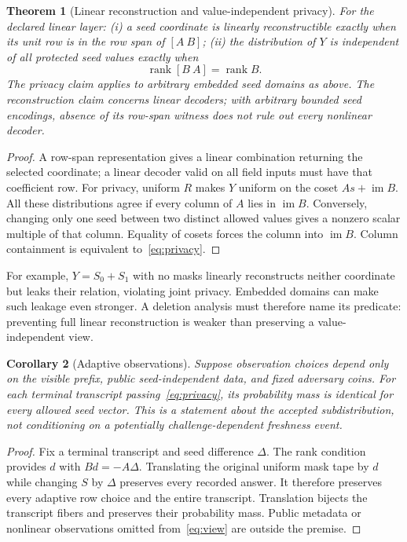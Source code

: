 \documentclass[pdflatex,sn-mathphys-num]{sn-jnl}
\theoremstyle{plain}
\newtheorem{theorem}{Theorem}
\newtheorem{corollary}[theorem]{Corollary}
\theoremstyle{definition}
\begin{document}
\begin{theorem}[Linear reconstruction and value-independent privacy]\label{thm:rank}
For the declared linear layer: (i) a seed coordinate is linearly reconstructible exactly when its unit row is in the row span of $[A\ B]$; (ii) the distribution of $Y$ is independent of all protected seed values exactly when
\begin{equation}\label{eq:privacy}
 \operatorname{rank}[B\ A]=\operatorname{rank}B.
\end{equation}
The privacy claim applies to arbitrary embedded seed domains as above. The reconstruction claim concerns linear decoders; with arbitrary bounded seed encodings, absence of its row-span witness does not rule out every nonlinear decoder.
\end{theorem}
\begin{proof}
A row-span representation gives a linear combination returning the selected coordinate; a linear decoder valid on all field inputs must have that coefficient row. For privacy, uniform $R$ makes $Y$ uniform on the coset $A s+\operatorname{im}B$. All these distributions agree if every column of $A$ lies in $\operatorname{im}B$. Conversely, changing only one seed between two distinct allowed values gives a nonzero scalar multiple of that column. Equality of cosets forces the column into $\operatorname{im}B$. Column containment is equivalent to~\eqref{eq:privacy}.
\end{proof}

For example, $Y=S_0+S_1$ with no masks linearly reconstructs neither coordinate but leaks their relation, violating joint privacy. Embedded domains can make such leakage even stronger. A deletion analysis must therefore name its predicate: preventing full linear reconstruction is weaker than preserving a value-independent view.

\begin{corollary}[Adaptive observations]\label{cor:adaptive}
Suppose observation choices depend only on the visible prefix, public seed-independent data, and fixed adversary coins. For each terminal transcript passing~\eqref{eq:privacy}, its probability mass is identical for every allowed seed vector. This is a statement about the accepted subdistribution, not conditioning on a potentially challenge-dependent freshness event.
\end{corollary}
\begin{proof}
Fix a terminal transcript and seed difference $\Delta$. The rank condition provides $d$ with $Bd=-A\Delta$. Translating the original uniform mask tape by $d$ while changing $S$ by $\Delta$ preserves every recorded answer. It therefore preserves every adaptive row choice and the entire transcript. Translation bijects the transcript fibers and preserves their probability mass. Public metadata or nonlinear observations omitted from~\eqref{eq:view} are outside the premise.
\end{proof}
\end{document}
